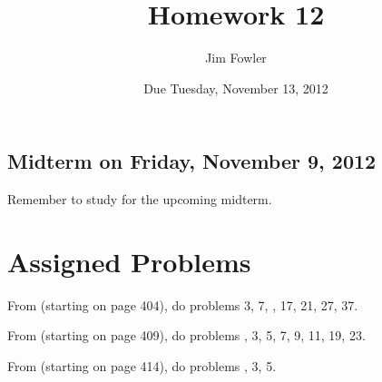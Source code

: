 \documentclass[12pt]{handout}
\title{Homework 12}
\date{Due Tuesday, November 13, 2012}
\author{Jim Fowler}
\begin{document}
\maketitle






\subsection*{Midterm on Friday, November  9, 2012}
Remember to study for the upcoming midterm.





\section*{Assigned Problems}

From  (starting on page 404),
do problems 3, 7, , 17, 21, 27, 37.
\vspace{1ex}

From  (starting on page 409),
do problems , 3, 5, 7, 9, 11, 19, 23.
\vspace{1ex}

From  (starting on page 414),
do problems , 3, 5.
\vspace{1ex}
\end{document}
